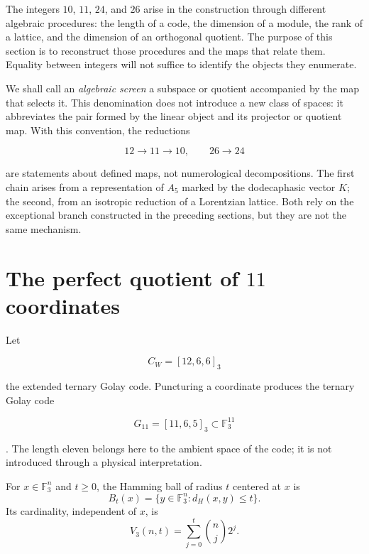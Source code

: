 \label{chap:pantallas-dualidad}

The integers \(10\), \(11\), \(24\), and \(26\) arise in the construction through
different algebraic procedures: the length of a code, the dimension of a
module, the rank of a lattice, and the dimension of an orthogonal quotient. The
purpose of this section is to reconstruct those procedures and the maps that
relate them. Equality between integers will not suffice to identify the
objects they enumerate.

We shall call an \emph{algebraic screen} a subspace or quotient accompanied
by the map that selects it. This denomination does not introduce a new class of
spaces: it abbreviates the pair formed by the linear object and its projector or
quotient map. With this convention, the reductions

\[
12\longrightarrow11\longrightarrow10,
\qquad
26\longrightarrow24
\]

are statements about defined maps, not numerological decompositions.
The first chain arises from a representation of \(A_5\) marked by the
dodecaphasic vector \(K\); the second, from an isotropic reduction of a
Lorentzian lattice. Both rely on the exceptional branch constructed in
the preceding sections, but they are not the same mechanism.

\section{The perfect quotient of \(11\) coordinates}
\label{sec:golay-once}

Let

\[
C_W=[12,6,6]_3
\]

the extended ternary Golay code. Puncturing a coordinate
produces the ternary Golay code

\[
G_{11}=[11,6,5]_3\subset\mathbb F_3^{11}
\]

\cite{MacWilliamsSloane1977}. The length eleven belongs here to the ambient
space of the code; it is not introduced through a physical interpretation.

\begin{definition}
For \(x\in\mathbb F_3^n\) and \(t\geq0\), the Hamming ball of radius \(t\)
centered at \(x\) is
\[
B_t(x)=\{y\in\mathbb F_3^n:d_H(x,y)\leq t\}.
\]
Its cardinality, independent of \(x\), is
\[
V_3(n,t)=\sum_{j=0}^{t}\binom nj2^j.
\]
\end{definition}

